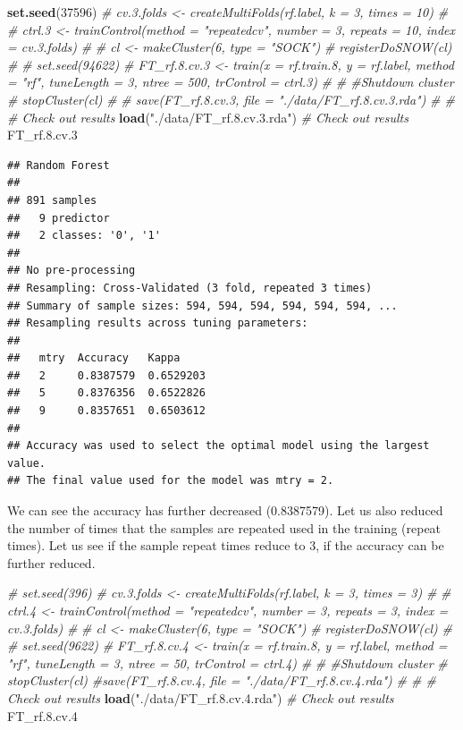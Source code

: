 \documentclass[
]{book}
\newenvironment{Shaded}{\begin{snugshade}}{\end{snugshade}}
\newcommand{\CommentTok}[1]{\textcolor[rgb]{0.56,0.35,0.01}{\textit{#1}}}
\newcommand{\DecValTok}[1]{\textcolor[rgb]{0.00,0.00,0.81}{#1}}
\newcommand{\FloatTok}[1]{\textcolor[rgb]{0.00,0.00,0.81}{#1}}
\newcommand{\KeywordTok}[1]{\textcolor[rgb]{0.13,0.29,0.53}{\textbf{#1}}}
\newcommand{\NormalTok}[1]{#1}
\newcommand{\StringTok}[1]{\textcolor[rgb]{0.31,0.60,0.02}{#1}}
\begin{document}
\begin{Shaded}
\begin{Highlighting}[]
\KeywordTok{set.seed}\NormalTok{(}\DecValTok{37596}\NormalTok{)}
\CommentTok{# cv.3.folds <- createMultiFolds(rf.label, k = 3, times = 10)}
\CommentTok{# }
\CommentTok{# ctrl.3 <- trainControl(method = "repeatedcv", number = 3, repeats = 10, index = cv.3.folds)}
\CommentTok{# }
\CommentTok{# cl <- makeCluster(6, type = "SOCK")}
\CommentTok{# registerDoSNOW(cl)}
\CommentTok{# }
\CommentTok{# set.seed(94622)}
\CommentTok{# FT_rf.8.cv.3 <- train(x = rf.train.8, y = rf.label, method = "rf", tuneLength = 3, ntree = 500, trControl = ctrl.3)}
\CommentTok{# }
\CommentTok{# #Shutdown cluster}
\CommentTok{# stopCluster(cl)}
\CommentTok{# }
\CommentTok{# save(FT_rf.8.cv.3, file = "./data/FT_rf.8.cv.3.rda")}
\CommentTok{# # # Check out results}
\KeywordTok{load}\NormalTok{(}\StringTok{"./data/FT_rf.8.cv.3.rda"}\NormalTok{)}
\CommentTok{# Check out results}
\NormalTok{FT_rf.}\FloatTok{8.}\NormalTok{cv}\FloatTok{.3}
\end{Highlighting}
\end{Shaded}

\begin{verbatim}
## Random Forest 
## 
## 891 samples
##   9 predictor
##   2 classes: '0', '1' 
## 
## No pre-processing
## Resampling: Cross-Validated (3 fold, repeated 3 times) 
## Summary of sample sizes: 594, 594, 594, 594, 594, 594, ... 
## Resampling results across tuning parameters:
## 
##   mtry  Accuracy   Kappa    
##   2     0.8387579  0.6529203
##   5     0.8376356  0.6522826
##   9     0.8357651  0.6503612
## 
## Accuracy was used to select the optimal model using the largest value.
## The final value used for the model was mtry = 2.
\end{verbatim}

We can see the accuracy has further decreased (0.8387579). Let us also reduced the number of times that the samples are repeated used in the training (repeat times). Let us see if the sample repeat times reduce to 3, if the accuracy can be further reduced.

\begin{Shaded}
\begin{Highlighting}[]
\CommentTok{# set.seed(396)}
\CommentTok{# cv.3.folds <- createMultiFolds(rf.label, k = 3, times = 3)}
\CommentTok{# }
\CommentTok{# ctrl.4 <- trainControl(method = "repeatedcv", number = 3, repeats = 3, index = cv.3.folds)}
\CommentTok{# }
\CommentTok{# cl <- makeCluster(6, type = "SOCK")}
\CommentTok{# registerDoSNOW(cl)}
\CommentTok{# }
\CommentTok{# set.seed(9622)}
\CommentTok{# FT_rf.8.cv.4 <- train(x = rf.train.8, y = rf.label, method = "rf", tuneLength = 3, ntree = 50, trControl = ctrl.4)}
\CommentTok{# }
\CommentTok{# #Shutdown cluster}
\CommentTok{# stopCluster(cl)}
\CommentTok{#save(FT_rf.8.cv.4, file = "./data/FT_rf.8.cv.4.rda")}
\CommentTok{# # # Check out results}
\KeywordTok{load}\NormalTok{(}\StringTok{"./data/FT_rf.8.cv.4.rda"}\NormalTok{)}
\CommentTok{# Check out results}
\NormalTok{FT_rf.}\FloatTok{8.}\NormalTok{cv}\FloatTok{.4}
\end{Highlighting}
\end{Shaded}
\end{document}
